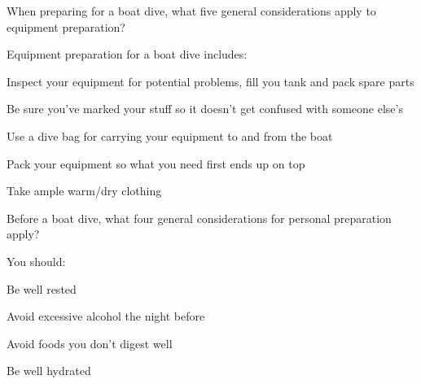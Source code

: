 	\begin{qanda}
		\begin{question}
When preparing for a boat dive, what five general considerations apply to equipment preparation?
		\end{question}

		\begin{answer}
Equipment preparation for a boat dive includes:
			\begin{nospacenumberedlist}
				\item Inspect your equipment for potential problems, fill you tank and pack spare parts
				\item Be sure you've marked your stuff so it doesn't get confused with someone else's
				\item Use a dive bag for carrying your equipment to and from the boat
				\item Pack your equipment so what you need first ends up on top
				\item Take ample warm/dry clothing
			\end{nospacenumberedlist}
		\end{answer}
	\end{qanda}

	\begin{qanda}
		\begin{question}
Before a boat dive, what four general considerations for personal preparation apply?
		\end{question}

		\begin{answer}
You should:
			\begin{nospacenumberedlist}
				\item Be well rested
				\item Avoid excessive alcohol the night before
				\item Avoid foods you don't digest well
				\item Be well hydrated
			\end{nospacenumberedlist}
		\end{answer}
	\end{qanda}

